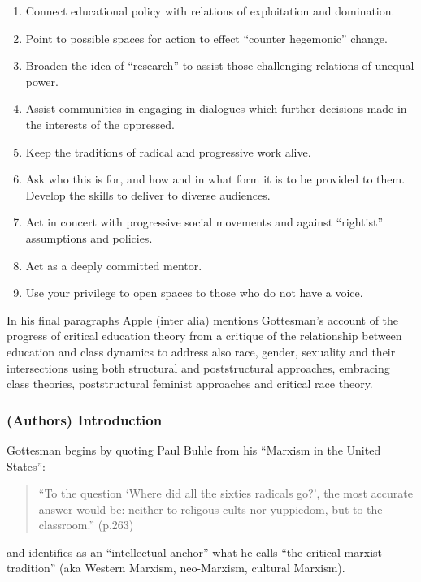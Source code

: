 \documentclass[10pt,titlepage]{book}
\begin{document}
\begin{enumerate}

\item Connect educational policy with relations of exploitation and domination.
  
\item Point to possible spaces for action to effect ``counter hegemonic'' change.
  
\item Broaden the idea of ``research'' to assist those challenging relations of unequal power.
  
\item Assist communities in engaging in dialogues which further decisions made in the interests of the oppressed.
  
\item Keep the traditions of radical and progressive work alive.
  
\item Ask who this is for, and how and in what form it is to be provided to them.
  Develop the skills to deliver to diverse audiences.
  
\item Act in concert with progressive social movements and against ``rightist'' assumptions and policies.
  
\item Act as a deeply committed mentor.

\item Use your privilege to open spaces to those who do not have a voice.
  
\end{enumerate}

In his final paragraphs Apple (inter alia) mentions Gottesman's account of the progress of critical education theory from a critique of the relationship between education and class dynamics to address also race, gender, sexuality and their intersections using both structural and poststructural approaches, embracing class theories, poststructural feminist approaches and critical race theory.

\subsubsection{(Authors) Introduction}

Gottesman begins by quoting Paul Buhle from his ``Marxism in the United States''\cite{buhle-histmarx}:

\begin{quotation}
  ``To the question `Where did all the sixties radicals go?', the most accurate answer would be: neither to religous cults nor yuppiedom, but to the classroom.'' (p.263)
  \end{quotation}
and identifies as an ``intellectual anchor'' what he calls ``the critical marxist tradition'' (aka Western Marxism, neo-Marxism, cultural Marxism).
\end{document}
